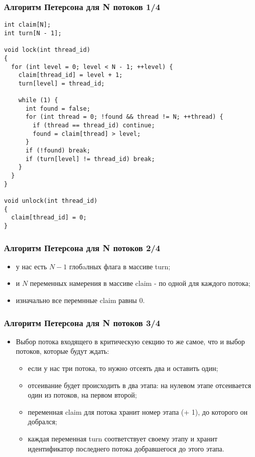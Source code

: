 \begin{frame}[fragile]
\frametitle{Алгоритм Петерсона для N потоков 1/4}
\begin{lstlisting}
int claim[N];
int turn[N - 1];

void lock(int thread_id)
{
  for (int level = 0; level < N - 1; ++level) {
    claim[thread_id] = level + 1;
    turn[level] = thread_id;

    while (1) {
      int found = false;
      for (int thread = 0; !found && thread != N; ++thread) {
        if (thread == thread_id) continue;
        found = claim[thread] > level;
      }
      if (!found) break;
      if (turn[level] != thread_id) break;
    }
  }
}

void unlock(int thread_id)
{
  claim[thread_id] = 0;
}
\end{lstlisting}
\end{frame}

\begin{frame}
\frametitle{Алгоритм Петерсона для N потоков 2/4}
\begin{itemize}
  \item у нас есть $N - 1$ глобaлных флага в массиве turn;
  \item и $N$ переменных намерения в массиве claim - по одной для каждого
  потока;
  \item изначально все перемнные claim равны 0.
\end{itemize}
\end{frame}

\begin{frame}
\frametitle{Алгоритм Петерсона для N потоков 3/4}
\begin{itemize}
  \item Выбор потока входящего в критическую секцию то же самое, что и выбор
  потоков, которые будут ждать:
  \begin{itemize}
    \item если у нас три потока, то нужно отсеять два и оставить один;
    \item отсеивание будет происходить в два этапа: на нулевом этапе отсеивается
    один из потоков, на первом второй;
    \item переменная claim для потока хранит номер этапа (+ 1), до которого он
    добрался;
    \item каждая переменная turn соответствует своему этапу и хранит
    идентификатор последнего потока добравшегося до этого этапа.
  \end{itemize}
\end{itemize}
\end{frame}

